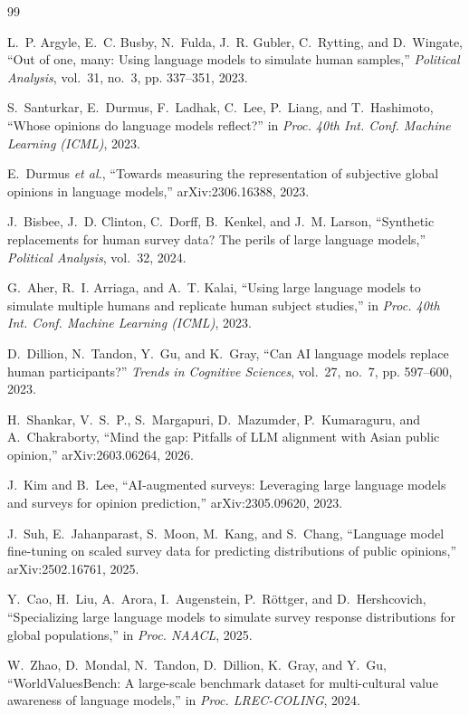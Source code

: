 \documentclass[conference]{IEEEtran}
\begin{document}
\begin{thebibliography}{99}

L.~P. Argyle, E.~C. Busby, N.~Fulda, J.~R. Gubler, C.~Rytting, and D.~Wingate, ``Out of one, many: Using language models to simulate human samples,'' \emph{Political Analysis}, vol.~31, no.~3, pp. 337--351, 2023.

S.~Santurkar, E.~Durmus, F.~Ladhak, C.~Lee, P.~Liang, and T.~Hashimoto, ``Whose opinions do language models reflect?'' in \emph{Proc. 40th Int. Conf. Machine Learning (ICML)}, 2023.

E.~Durmus \emph{et al.}, ``Towards measuring the representation of subjective global opinions in language models,'' arXiv:2306.16388, 2023.

J.~Bisbee, J.~D. Clinton, C.~Dorff, B.~Kenkel, and J.~M. Larson, ``Synthetic replacements for human survey data? The perils of large language models,'' \emph{Political Analysis}, vol.~32, 2024.

G.~Aher, R.~I. Arriaga, and A.~T. Kalai, ``Using large language models to simulate multiple humans and replicate human subject studies,'' in \emph{Proc. 40th Int. Conf. Machine Learning (ICML)}, 2023.

D.~Dillion, N.~Tandon, Y.~Gu, and K.~Gray, ``Can AI language models replace human participants?'' \emph{Trends in Cognitive Sciences}, vol.~27, no.~7, pp. 597--600, 2023.

H.~Shankar, V.~S.~P., S.~Margapuri, D.~Mazumder, P.~Kumaraguru, and A.~Chakraborty, ``Mind the gap: Pitfalls of LLM alignment with Asian public opinion,'' arXiv:2603.06264, 2026.

J.~Kim and B.~Lee, ``AI-augmented surveys: Leveraging large language models and surveys for opinion prediction,'' arXiv:2305.09620, 2023.

J.~Suh, E.~Jahanparast, S.~Moon, M.~Kang, and S.~Chang, ``Language model fine-tuning on scaled survey data for predicting distributions of public opinions,'' arXiv:2502.16761, 2025.

Y.~Cao, H.~Liu, A.~Arora, I.~Augenstein, P.~R\"{o}ttger, and D.~Hershcovich, ``Specializing large language models to simulate survey response distributions for global populations,'' in \emph{Proc. NAACL}, 2025.

W.~Zhao, D.~Mondal, N.~Tandon, D.~Dillion, K.~Gray, and Y.~Gu, ``WorldValuesBench: A large-scale benchmark dataset for multi-cultural value awareness of language models,'' in \emph{Proc. LREC-COLING}, 2024.


\end{thebibliography}
\end{document}
